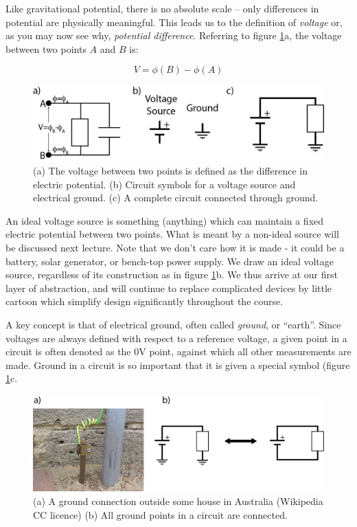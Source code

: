 \documentclass{tufte-book}
\begin{document}
Like gravitational potential, there is no absolute scale -- only differences in potential are physically meaningful. This leads us to the definition of \textit{voltage} or, as you may now see why, \textit{potential difference}. Referring to figure \ref{fig:volt_ref}a, the voltage between two points $A$ and $B$ is:

\begin{equation}
  \boxed{V = \phi(B)-\phi(A)}
\end{equation}

\begin{figure}
\caption{(a) The voltage between two points is defined as the difference in electric potential. (b) Circuit symbols for a voltage source and electrical ground. (c) A complete circuit connected through ground.}
\label{fig:volt_ref}
\begin{center}
\includegraphics[width=\textwidth]{volt_ref}
\end{center}
\end{figure}

An ideal voltage source is something (anything) which can maintain a fixed electric potential between two points. What is meant by a non-ideal source will be discussed next lecture. Note that we don't care how it is made - it could be a battery, solar generator, or bench-top power supply. We draw an ideal voltage source, regardless of its construction as in figure \ref{fig:volt_ref}b. We thus arrive at our first layer of abstraction, and will continue to replace complicated devices by little cartoon which simplify design significantly throughout the course.

A key concept is that of electrical ground, often called \textit{ground}, or ``earth''. Since voltages are always defined with respect to a reference voltage, a given point in a circuit is often denoted as the 0V point, against which all other measurements are made. Ground in a circuit is so important that it is given a special symbol (figure \ref{fig:volt_ref}c. 

\begin{figure}
\caption{(a) A ground connection outside some house in Australia (Wikipedia CC licence) (b) All ground points in a circuit are connected.}
\label{fig:ground_ref}
\begin{center}
\includegraphics[width=\textwidth]{ground_and_pound}
\end{center}
\end{figure}
\end{document}
